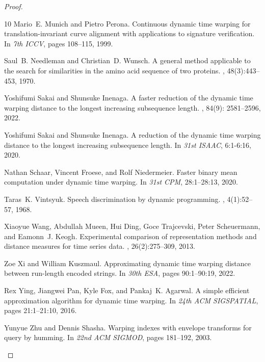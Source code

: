 \documentclass[10pt,a4paper]{article}
\begin{document}
\begin{proof}
\begin{thebibliography}{10}
Mario~E. Munich and Pietro Perona.
\newblock Continuous dynamic time warping for translation-invariant curve
  alignment with applications to signature verification.
\newblock In {\em 7th {ICCV}}, pages 108--115, 1999.

Saul~B. Needleman and Christian~D. Wunsch.
\newblock A general method applicable to the search for similarities in the
  amino acid sequence of two proteins.
, 48(3):443--453, 1970.

Yoshifumi Sakai and Shunsuke Inenaga.
\newblock A faster reduction of the dynamic time warping distance to the
  longest increasing subsequence length. 
 , 84(9): 2581--2596, 2022.

Yoshifumi Sakai and Shunsuke Inenaga.
\newblock A reduction of the dynamic time warping distance to the longest
  increasing subsequence length.
\newblock In {\em 31st {ISAAC}}, 6:1-6:16, 2020.

Nathan Schaar, Vincent Froese, and Rolf Niedermeier.
\newblock Faster binary mean computation under dynamic time warping.
\newblock In {\em 31st {CPM}}, 28:1--28:13, 2020.

Taras~K. Vintsyuk.
\newblock Speech discrimination by dynamic programming.
, 4(1):52--57, 1968.

Xiaoyue Wang, Abdullah Mueen, Hui Ding, Goce Trajcevski, Peter Scheuermann, and
  Eamonn~J. Keogh.
\newblock Experimental comparison of representation methods and distance
  measures for time series data.
, 26(2):275--309, 2013.

Zoe Xi and William Kuszmaul.
\newblock Approximating dynamic time warping distance between run-length
  encoded strings.
\newblock In {\em 30th {ESA}}, pages 90:1--90:19, 2022.

Rex Ying, Jiangwei Pan, Kyle Fox, and Pankaj~K. Agarwal.
\newblock A simple efficient approximation algorithm for dynamic time warping.
\newblock In {\em 24th {ACM SIGSPATIAL}}, pages 21:1--21:10, 2016.

Yunyue Zhu and Dennis Shasha.
\newblock Warping indexes with envelope transforms for query by humming.
\newblock In {\em 22nd {ACM SIGMOD}}, pages 181--192, 2003.


\end{thebibliography}
\end{proof}
\end{document}
